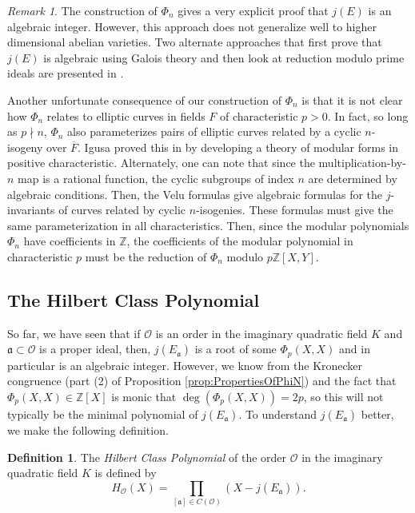 \documentclass{amsart}
\theoremstyle{definition}
\newtheorem{definition}[thm]{Definition}
\theoremstyle{remark}
\newtheorem{remark}[thm]{Remark}
\numberwithin{equation}{section}
\newcommand{\cO}{\mathcal O}
\newcommand{\fka}{\mathfrak a}
\newcommand{\bbZ}{\mathbb Z}
\begin{document}
\begin{remark}
The construction of $\Phi_{n}$ gives a very explicit proof that $j(E)$ is an algebraic integer. However, this approach does not generalize well to higher dimensional abelian varieties. Two alternate approaches that first prove that $j(E)$ is algebraic using Galois theory and then look at reduction modulo prime ideals are presented in \cite{SilvermanAEC}.

Another unfortunate consequence of our construction of $\Phi_{n}$ is that it is not clear how $\Phi_{n}$ relates to elliptic curves in fields $F$ of characteristic $p > 0$. In fact, so long as $p \nmid n$, $\Phi_{n}$ also parameterizes pairs of elliptic curves related by a cyclic $n$-isogeny over $\overline{F}$. Igusa proved this in \cite{IgusaKM}
by developing a theory of modular forms in positive characteristic. Alternately, one can note that since the multiplication-by-$n$ map is a rational function, the cyclic subgroups of index $n$ are determined by algebraic conditions. Then, the Velu formulas give algebraic formulas for the $j$-invariants of curves related by cyclic $n$-isogenies. These formulas must give the same parameterization in all characteristics. Then, since the modular polynomials $\Phi_{n}$ have coefficients in $\bbZ$, the coefficients of the modular polynomial in characteristic $p$ must be the reduction of $\Phi_{n}$ modulo $p\bbZ[X,Y]$.
\end{remark}


\subsection{The Hilbert Class Polynomial} \label{subsec:HilbertClassPolynomial}

 So far, we have seen that if $\cO$ is an order in the imaginary quadratic field $K$ and $\fka \subset \cO$ is a proper ideal, then, $j(E_{\fka})$ is a root of some $\Phi_{p}(X,X)$ and in particular is an algebraic integer. However, we know from the Kronecker congruence (part (2) of Proposition \ref{prop:PropertiesOfPhiN}) and the fact that $\Phi_{p}(X,X) \in \bbZ[X]$ is monic that $\deg(\Phi_{p}(X,X)) = 2p$, so this will not typically be the minimal polynomial of $j(E_{\fka})$. To understand $j(E_{\fka})$ better, we make the following definition. 
 
 \begin{definition} \label{def:HilbertClassPolynomial}
 The \emph{Hilbert Class Polynomial} of the order $\cO$ in the imaginary quadratic field $K$ is defined by 
 \[
 H_{\cO}(X) = \prod_{[\fka] \in C(\cO)} (X - j(E_{\fka})).
 \]
 \end{definition}
 
\end{document}

